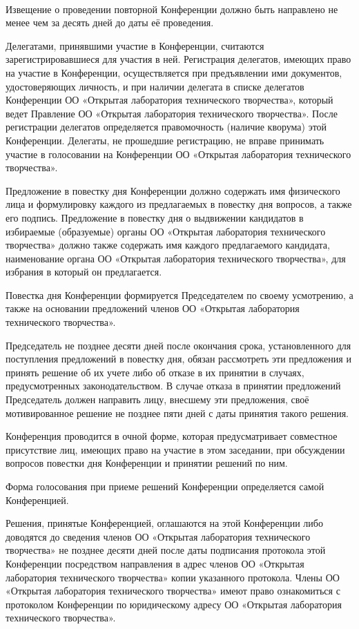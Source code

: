 \documentclass[a4paper,fontsize=14pt,titlepage]{scrartcl}
\makeatletter
\newenvironment{numberedpars}{%
  \addtocounter{secnumdepth}{1}
  \renewcommand\theparagraph{\arabic{section}.\arabic{paragraph}}
  \renewcommand\@seccntformat[1]
  {\expandafter\ifx\csname##1\endcsname\paragraph\csname 
  the##1\endcsname\else\csname the##1\endcsname\quad\fi}
  \let\old@par=\par
  \def\new@par{\let\par=\old@par\paragraph{}\let\par=\new@par}
  \let\par=\new@par
  \par
}{
  \addtocounter{secnumdepth}{-1}
}
\makeatother
\begin{document}
\begin{numberedpars}
Извещение о проведении повторной Конференции должно быть направлено не менее чем за десять дней до даты её проведения.

Делегатами, принявшими участие в Конференции, считаются зарегистрировавшиеся для участия в ней. Регистрация делегатов,
имеющих право на участие в Конференции, осуществляется при предъявлении ими документов, удостоверяющих личность, и при
наличии делегата в списке делегатов Конференции ОО «Открытая лаборатория технического творчества», который ведет
Правление ОО «Открытая лаборатория технического творчества». После регистрации делегатов определяется правомочность
(наличие кворума) этой Конференции. Делегаты, не прошедшие регистрацию, не вправе принимать участие в голосовании на
Конференции ОО «Открытая лаборатория технического творчества».

Предложение в повестку дня Конференции должно содержать имя физического лица и формулировку каждого из предлагаемых в
повестку дня вопросов, а также его подпись. Предложение в повестку дня о выдвижении кандидатов в избираемые (образуемые)
органы ОО «Открытая лаборатория технического творчества» должно также содержать имя каждого предлагаемого кандидата,
наименование органа ОО «Открытая лаборатория технического творчества», для избрания в который он предлагается.

Повестка дня Конференции формируется Председателем по своему усмотрению, а также на основании предложений членов ОО
«Открытая лаборатория технического творчества». 

Председатель не позднее десяти дней после окончания срока, установленного для поступления предложений в повестку дня,
обязан рассмотреть эти предложения и принять решение об их учете либо об отказе в их принятии в случаях, предусмотренных
законодательством. В случае отказа в принятии предложений Председатель должен направить лицу, внесшему эти предложения,
своё мотивированное решение не позднее пяти дней с даты принятия такого решения.

Конференция проводится в очной форме, которая предусматривает совместное присутствие лиц, имеющих право на участие в
этом заседании, при обсуждении вопросов повестки дня Конференции и принятии решений по ним.

Форма голосования при приеме решений Конференции определяется самой Конференцией.

Решения, принятые Конференцией, оглашаются на этой Конференции либо доводятся до сведения членов ОО «Открытая
лаборатория технического творчества» не позднее десяти дней после даты подписания протокола этой Конференции посредством
направления в адрес членов ОО «Открытая лаборатория технического творчества» копии указанного протокола. Члены ОО
«Открытая лаборатория технического творчества» имеют право ознакомиться с протоколом Конференции по юридическому адресу
ОО «Открытая лаборатория технического творчества».


\end{numberedpars}
\end{document}
